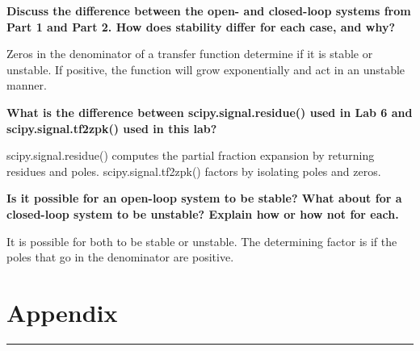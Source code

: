 \documentclass[12pt]{report}
\begin{document}
\textbf{Discuss the difference between the open- and closed-loop systems from Part 1 and Part 2. How does stability differ for each case, and why?}
\vspace{.5cm}

Zeros in the denominator of a transfer function determine if it is stable or unstable. If positive, the function will grow exponentially and act in an unstable manner.\par
\vspace{.5cm}

\textbf{What is the difference between scipy.signal.residue() used in Lab 6 and scipy.signal.tf2zpk() used in this lab?}
\vspace{.5cm}

scipy.signal.residue() computes the partial fraction expansion by returning residues and poles. scipy.signal.tf2zpk() factors by isolating poles and zeros. 
\vspace{.5cm}

\textbf{Is it possible for an open-loop system to be stable? What about for a closed-loop system to
be unstable? Explain how or how not for each.}
\vspace{.5cm}

It is possible for both to be stable or unstable. The determining factor is if the poles that go in the denominator are positive. 
\newpage
\section*{Appendix}
\hrule
\vspace{1cm}
\setlength{\parindent}{5ex}
\end{document}

